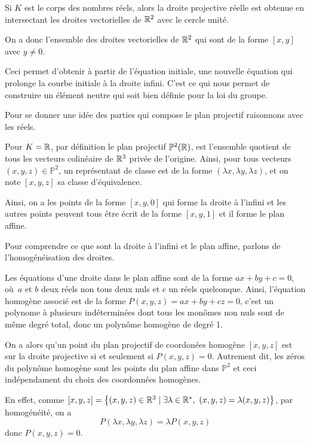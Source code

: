 Si $K$ est le corps des nombres réels, alors la droite projective réelle est obtenue en
intersectant les droites vectorielles de $\mathbb{R}^2$ avec le cercle unité.

On a donc l'ensemble des droites vectorielles de $\mathbb{R}^2$ qui sont de la forme $\left[ x,y
\right] $ avec $y\neq 0$.


Ceci permet d'obtenir à partir de l'équation initiale, une nouvelle équation qui prolonge la
courbe initiale à la droite infini. C'est ce qui nous permet de construire un élément neutre
qui soit bien définie pour la loi du groupe.

Pour se donner une idée des parties qui compose le plan projectif raisonnons avec les réels.

Pour $K=\mathbb{R}$, par définition le plan projectif $\mathbb{P}^2(\mathbb{R})$, est l'ensemble quotient de
tous les vecteurs colinéaire de $\mathbb{R}^3$ privée de l'origine. Ainsi, pour tous vecteurs $(x,y,z)
\in \mathbb{P}^2$, un représentant de classe est de la forme $\left( \lambda x, \lambda y,
\lambda z \right) $, et on note $\left[ x,y,z \right] $ sa classe d'équivalence. 


Ainsi, on a les points de la forme $\left[ x,y,0 \right] $ qui forme la droite à l'infini et
les autres points peuvent tous être écrit de la forme $\left[ x,y,1 \right] $ et il forme le
plan affine.

Pour comprendre ce que sont la droite à l'infini et le plan affine, parlons de
l'homogénéisation des droites.

Les équations d'une droite dans le plan affine sont de la forme $ax + by + c = 0$, où $a$ et
$b$ deux réels non tous deux nuls et $c$ un réels quelconque. Ainsi, l'équation homogène
associé est de la forme $P(x,y,z) = ax + by + cz = 0$, c'est un polynome à plusieurs
indéterminées dont tous les monômes non nuls sont de même degré total, donc un polynôme
homogène de degré 1.

On a alors qu'un point du plan projectif de coordonées homogène $\left[ x,y,z \right] $ est sur
la droite projective si et seulement si $P(x,y,z) = 0$. Autrement dit, les zéros du polynôme
homogène sont les points du plan affine dans $\mathbb{P}^2$ et ceci indépendament du choix des
coordonnées homogènes. 

En effet, comme $\left[ x,y,z \right] = \left\{ (x,y,z) \in
\mathbb{R}^3 \mid \exists \lambda \in \mathbb{R}^{*},\ (x,y,z) = \lambda(x,y,z) \right\}$, par homogénéité, on
a
\[
P(\lambda x, \lambda y, \lambda z) = \lambda P(x,y,z) 
\] 
donc $P(x,y,z)=0$.


